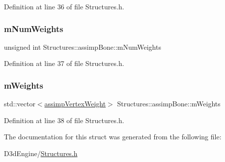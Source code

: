 Definition at line 36 of file Structures.\+h.

\mbox{\label{struct_structures_1_1assimp_bone_ae16c31e3a38c9c33b7ea6215ceb41c23}} 
\subsubsection{\texorpdfstring{m\+Num\+Weights}{mNumWeights}}
{\footnotesize\ttfamily unsigned int Structures\+::assimp\+Bone\+::m\+Num\+Weights}



Definition at line 37 of file Structures.\+h.

\mbox{\label{struct_structures_1_1assimp_bone_aba89fb8838ebfc69e0379773d0e6d7b7}} 
\subsubsection{\texorpdfstring{m\+Weights}{mWeights}}
{\footnotesize\ttfamily std\+::vector$<$\mbox{\hyperlink{struct_structures_1_1assimp_vertex_weight}{assimp\+Vertex\+Weight}}$>$ Structures\+::assimp\+Bone\+::m\+Weights}



Definition at line 38 of file Structures.\+h.



The documentation for this struct was generated from the following file\+:\begin{DoxyCompactItemize}
\item 
D3d\+Engine/\mbox{\hyperlink{_structures_8h}{Structures.\+h}}\end{DoxyCompactItemize}
